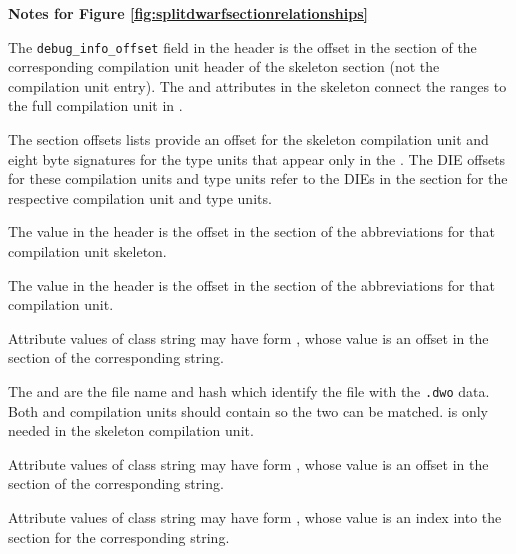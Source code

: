 \clearpage
\begin{center}
   \textbf{Notes for Figure \ref{fig:splitdwarfsectionrelationships}}
\end{center}
\begin{description}
The \texttt{debug\_info\_offset} field in the header is the 
offset in the \dotdebuginfo{} section of the corresponding 
compilation unit header of the skeleton \dotdebuginfo{} section 
(not the compilation unit entry).  The \DWATdwoid{} and 
\DWATdwoname{} attributes in the \dotdebuginfo{} skeleton 
connect the ranges to the full compilation unit in \dotdebuginfodwo.

The \dotdebugnames{} section  offsets lists provide an offset
for the skeleton compilation unit and eight 
byte signatures for the type units that appear only in the 
\dotdebuginfodwo. The DIE offsets for these 
compilation units and type units refer to the DIEs in the 
\dotdebuginfodwo{} section for the respective 
compilation unit and type units.

The \HFNdebugabbrevoffset{} value in the header is 
the offset in the \dotdebugabbrev{} section of the 
abbreviations for that compilation unit skeleton.

The \HFNdebugabbrevoffset{} value in the header 
is the offset in the \dotdebugabbrevdwo{} section of the 
abbreviations for that compilation unit.

Attribute values of class string may have form \DWFORMstrp, 
whose value is an offset in the 
\dotdebugstr{} section of the corresponding string.

The \DWATdwoname{} and \DWATdwoid{} are the file name 
and hash which identify the file with 
the \texttt{.dwo} data. Both \dotdebuginfo{} and 
\dotdebuginfodwo{} compilation units should contain 
\DWATdwoid{} so the two can be matched.  \DWATdwoname{} 
is only needed in the \dotdebuginfo{} 
skeleton compilation unit. 

Attribute values of class string may have form 
\DWFORMstrp, whose value is an offset in the 
\dotdebugstrdwo{} section of the corresponding string.

Attribute values of class string may have form 
\DWFORMstrx, whose value is an index into  the 
\dotdebugstroffsets{} section for the corresponding string.


\end{description}
